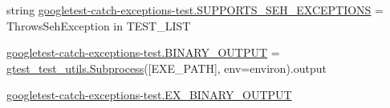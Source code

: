 \begin{DoxyCompactItemize}
\item 
string \mbox{\hyperlink{namespacegoogletest-catch-exceptions-test_ae72da371134ddf921c9edf36788f7ecd}{googletest-\/catch-\/exceptions-\/test.\+S\+U\+P\+P\+O\+R\+T\+S\+\_\+\+S\+E\+H\+\_\+\+E\+X\+C\+E\+P\+T\+I\+O\+NS}} = \textquotesingle{}Throws\+Seh\+Exception\textquotesingle{} in T\+E\+S\+T\+\_\+\+L\+I\+ST
\item 
\mbox{\hyperlink{namespacegoogletest-catch-exceptions-test_ac02efc4cd44ac24ba2c8d34a0e787693}{googletest-\/catch-\/exceptions-\/test.\+B\+I\+N\+A\+R\+Y\+\_\+\+O\+U\+T\+P\+UT}} = \mbox{\hyperlink{classgtest__test__utils_1_1_subprocess}{gtest\+\_\+test\+\_\+utils.\+Subprocess}}(\mbox{[}E\+X\+E\+\_\+\+P\+A\+TH\mbox{]}, env=environ).output
\item 
\mbox{\hyperlink{namespacegoogletest-catch-exceptions-test_a291a1ed9c774889e37aab2e7a526fc80}{googletest-\/catch-\/exceptions-\/test.\+E\+X\+\_\+\+B\+I\+N\+A\+R\+Y\+\_\+\+O\+U\+T\+P\+UT}}
\end{DoxyCompactItemize}
